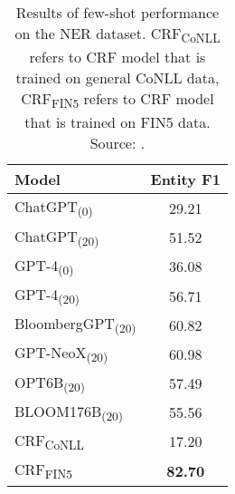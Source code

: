 \begin{table}[!h]
	\centering
	\begin{tabularx}{0.8\textwidth}{Xc}
		\toprule
		\textbf{Model}                   & \textbf{Entity F1} \\
		\midrule
		ChatGPT\textsubscript{(0)}       & 29.21              \\
		ChatGPT\textsubscript{(20)}      & 51.52              \\
		GPT-4\textsubscript{(0)}         & 36.08              \\
		GPT-4\textsubscript{(20)}        & 56.71              \\
		BloombergGPT\textsubscript{(20)} & 60.82              \\
		GPT-NeoX\textsubscript{(20)}     & 60.98              \\
		OPT6B\textsubscript{(20)}        & 57.49              \\
		BLOOM176B\textsubscript{(20)}    & 55.56              \\
		CRF\textsubscript{CoNLL}         & 17.20              \\
		CRF\textsubscript{FIN5}          & \textbf{82.70}     \\
		\bottomrule
	\end{tabularx}
	\caption{Results of few-shot performance on the NER dataset. CRF\textsubscript{CoNLL} refers to CRF model that is trained on general CoNLL data, CRF\textsubscript{FIN5} refers to CRF model that is trained on FIN5 data. Source: \protect\textcite{li2023chatgpt}.}
	\label{tab:ner_few_shot_performance}
\end{table}

